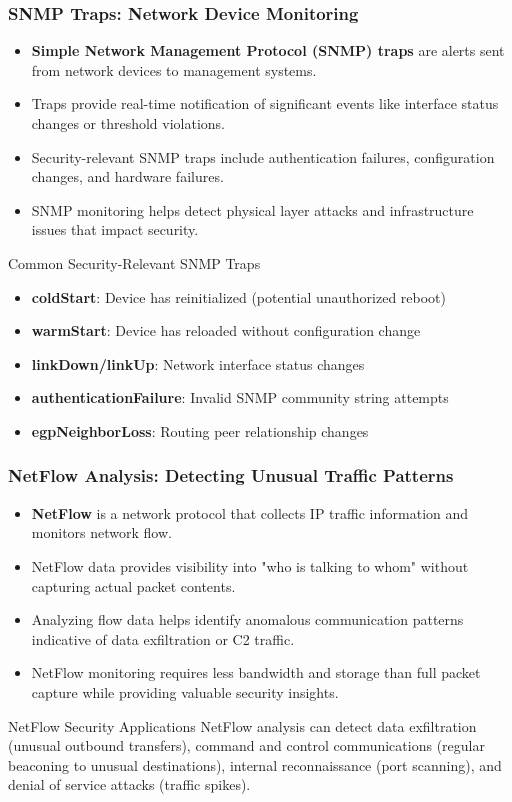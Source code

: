 \documentclass{beamer}
\begin{document}
\begin{frame}
    \frametitle{SNMP Traps: Network Device Monitoring}
    \begin{itemize}
    \item \textbf{Simple Network Management Protocol (SNMP) traps} are alerts sent from network devices to management systems.
    \item Traps provide real-time notification of significant events like interface status changes or threshold violations.
    \item Security-relevant SNMP traps include authentication failures, configuration changes, and hardware failures.
    \item SNMP monitoring helps detect physical layer attacks and infrastructure issues that impact security.
    \end{itemize}
    
    \begin{block}{Common Security-Relevant SNMP Traps}
        \scriptsize
    \begin{itemize}
    \item \textbf{coldStart}: Device has reinitialized (potential unauthorized reboot)
    \item \textbf{warmStart}: Device has reloaded without configuration change
    \item \textbf{linkDown/linkUp}: Network interface status changes
    \item \textbf{authenticationFailure}: Invalid SNMP community string attempts
    \item \textbf{egpNeighborLoss}: Routing peer relationship changes
    \end{itemize}
    \end{block}
    \end{frame}
    
    \begin{frame}
    \frametitle{NetFlow Analysis: Detecting Unusual Traffic Patterns}
    \begin{itemize}
    \item \textbf{NetFlow} is a network protocol that collects IP traffic information and monitors network flow.
    \item NetFlow data provides visibility into "who is talking to whom" without capturing actual packet contents.
    \item Analyzing flow data helps identify anomalous communication patterns indicative of data exfiltration or C2 traffic.
    \item NetFlow monitoring requires less bandwidth and storage than full packet capture while providing valuable security insights.
    \end{itemize}
    
    \begin{alertblock}{NetFlow Security Applications}
        \scriptsize
    NetFlow analysis can detect data exfiltration (unusual outbound transfers), command and control communications (regular beaconing to unusual destinations), internal reconnaissance (port scanning), and denial of service attacks (traffic spikes).
    \end{alertblock}
    \end{frame}
\end{document}
